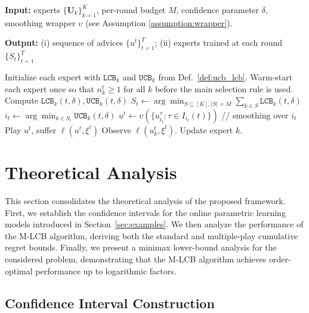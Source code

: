 \documentclass[a4paper,14pt]{extarticle}
\theoremstyle{plain}
\newcommand{\algname}[1]{{\textsf  #1}}
\newcommand{\LCB}{\texttt{LCB}}
\newcommand{\UCB}{\texttt{UCB}}
\begin{document}
\begin{algorithm}[ht!]
\caption{\algname{M-LCB}}
\label{algorithm:M_LCB}
\begin{algorithmic}[1]
\STATE \textbf{Input:} experts $\{\mathbf{U}_k\}_{k=1}^K$, per-round budget $M$, confidence parameter $\delta$, smoothing wrapper $\upsilon$ (see Assumption \ref{assumption:wrapper}).

\STATE \textbf{Output:} (i) sequence of advices $\{u^t\}_{t=1}^T$; (ii) experts trained at each round $\{S_t\}_{t=1}^T$

\STATE Initialize each expert with $\LCB_k$ and $\UCB_k$ from Def.~\ref{def:ucb_lcb}.
\STATE Warm-start each expert once so that $n_k^t\ge 1$ for all $k$ before the main selection rule is used.
        \STATE Compute $\LCB_k(t,\delta), \UCB_k(t,\delta)$
    \ENDFOR
    \STATE $S_t \gets \arg\min_{S\subseteq[K],|S|=M}\sum_{k\in S}\LCB_k(t,\delta)$
    \STATE $i_t \gets \arg\min_{k\in S_t}\UCB_k(t,\delta)$
    \STATE $u^t \gets \upsilon(\{u_{i_t}^\tau: \tau \in I_{i_t}(t)\})$ \hfill // smoothing over $i_t$
    \STATE Play $u^t$, suffer $\ell(u^t,\xi^t)$
        \STATE Observe $\ell(u_k^t, \xi^t)$.
        \STATE Update expert $k$.
    \ENDFOR
\ENDFOR
\end{algorithmic}
\end{algorithm}



\section{Theoretical Analysis}
\label{sec:theoretical_analysis}
This section consolidates the theoretical analysis of the proposed framework. First, we establish the confidence intervals for the online parametric learning models introduced in Section~\ref{sec:examples}. We then analyze the performance of the \algname{M-LCB} algorithm, deriving both the standard and multiple-play cumulative regret bounds. Finally, we present a minimax lower-bound analysis for the considered problem, demonstrating that the \algname{M-LCB} algorithm achieves order-optimal performance up to logarithmic factors.

\vspace{-8pt}
\subsection{Confidence Interval Construction}
\label{sec:confidence-interval-construction}
\end{document}
